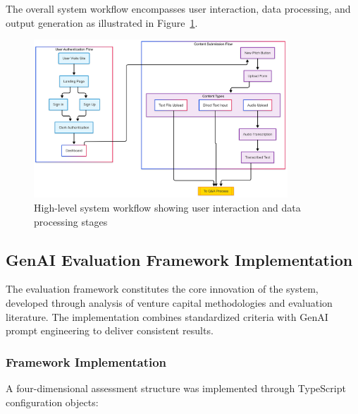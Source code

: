 The overall system workflow encompasses user interaction, data processing, and output generation as illustrated in Figure~\ref{fig:user-flow}.

\begin{figure}[H]
  \centering
  \includegraphics[width=0.85\textwidth]{img/user-diagram-flow}
  \caption{High-level system workflow showing user interaction and data processing stages}
  \label{fig:user-flow}
\end{figure}

\subsection{GenAI Evaluation Framework Implementation}\label{subsec:evaluation-framework}
The evaluation framework constitutes the core innovation of the system, developed through analysis of venture capital methodologies and evaluation literature. The implementation combines standardized criteria with GenAI prompt engineering to deliver consistent results.

\subsubsection{Framework Implementation}
A four-dimensional assessment structure was implemented through TypeScript configuration objects:


